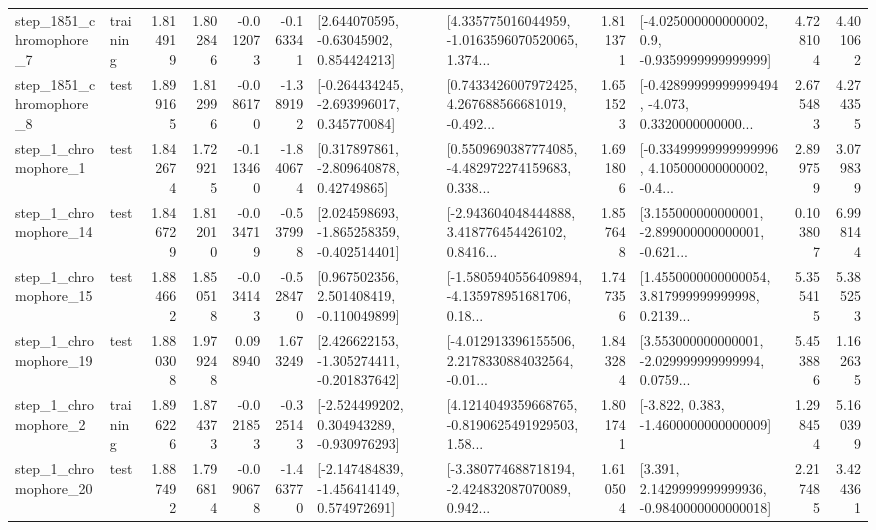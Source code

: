 \begin{tabular}{llrrrrllrlrr}
  step\_1851\_chromophore\_7 &  training &      1.814919 &    1.802846 &     -0.012073 & -0.163341 &     [2.644070595, -0.63045902, 0.854424213] &  [4.335775016044959, -1.0163596070520065, 1.374... &       1.811371 &     [-4.025000000000002, 0.9, -0.9359999999999999] &            4.728104 &          4.401062 \\
  step\_1851\_chromophore\_8 &      test &      1.899165 &    1.812996 &     -0.086170 & -1.389192 &   [-0.264434245, -2.693996017, 0.345770084] &  [0.7433426007972425, 4.267688566681019, -0.492... &       1.651523 &  [-0.42899999999999494, -4.073, 0.3320000000000... &            2.675483 &          4.274355 \\
     step\_1\_chromophore\_1 &      test &      1.842674 &    1.729215 &     -0.113460 & -1.840674 &     [0.317897861, -2.809640878, 0.42749865] &  [0.5509690387774085, -4.482972274159683, 0.338... &       1.691806 &  [-0.33499999999999996, 4.105000000000002, -0.4... &            2.899759 &          3.079839 \\
    step\_1\_chromophore\_14 &      test &      1.846729 &    1.812010 &     -0.034719 & -0.537998 &   [2.024598693, -1.865258359, -0.402514401] &  [-2.943604048444888, 3.418776454426102, 0.8416... &       1.857648 &  [3.155000000000001, -2.899000000000001, -0.621... &            0.103807 &          6.998144 \\
    step\_1\_chromophore\_15 &      test &      1.884662 &    1.850518 &     -0.034143 & -0.528470 &    [0.967502356, 2.501408419, -0.110049899] &  [-1.5805940556409894, -4.135978951681706, 0.18... &       1.747356 &  [1.4550000000000054, 3.817999999999998, 0.2139... &            5.355415 &          5.385253 \\
    step\_1\_chromophore\_19 &      test &      1.880308 &    1.979248 &      0.098940 &  1.673249 &   [2.426622153, -1.305274411, -0.201837642] &  [-4.012913396155506, 2.2178330884032564, -0.01... &       1.843284 &  [3.553000000000001, -2.029999999999994, 0.0759... &            5.453886 &          1.162635 \\
     step\_1\_chromophore\_2 &  training &      1.896226 &    1.874373 &     -0.021853 & -0.325143 &   [-2.524499202, 0.304943289, -0.930976293] &  [4.1214049359668765, -0.8190625491929503, 1.58... &       1.801741 &               [-3.822, 0.383, -1.4600000000000009] &            1.298454 &          5.160399 \\
    step\_1\_chromophore\_20 &      test &      1.887492 &    1.796814 &     -0.090678 & -1.463770 &   [-2.147484839, -1.456414149, 0.574972691] &  [-3.380774688718194, -2.424832087070089, 0.942... &       1.610504 &   [3.391, 2.1429999999999936, -0.9840000000000018] &            2.217485 &          3.424361 \\

\end{tabular}
